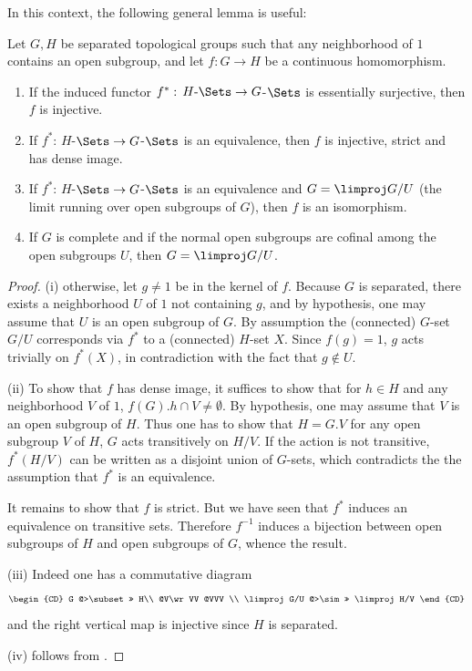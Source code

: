 \medskip In this context, the following general lemma is useful:

\begin{lem}\label{lem::1.4.9} Let $G, H$ be separated topological groups
 such that any neighborhood of $1$ contains an open 
 subgroup, and let $f: G\to H$ be a continuous homomorphism.
 \begin{enumerate}
  \item If the induced functor 
	$f^\ast:\,\text{$H$-$\Sets$}\to G$-$\Sets$ is essentially
	surjective, then $f$ is injective.
  \item If $f^\ast:\,H$-$\Sets \to G$-$\Sets$ is an equivalence, then $f$ is
	injective, strict and has dense image.
  \item If $f^\ast:\,H$-$\Sets\to G$-$\Sets$ is an equivalence and $G=
	\limproj G/U$ (the limit running over open subgroups of $G$),
	then $f$ is an isomorphism.
  \item If $G$ is complete and if the normal open subgroups are cofinal
	among the open subgroups $U$, then $G=\limproj G/U$.
 \end{enumerate}
\end{lem}
  
\begin{proof}
 (i) otherwise, let $g\neq 1$ be in the kernel of $f$. Because $G$ is
 separated, there exists a neighborhood $U$ of $1$ not containing $g$,
 and by hypothesis, one may assume that $U$ is an open subgroup of
 $G$. By assumption the (connected) $G$-set $G/U$ corresponds via
 $f^\ast$ to a (connected) $H$-set $X$. Since $f(g)=1$, $g$ acts 
 trivially on $f^\ast(X)$, in contradiction with the fact that $g\notin U$.

 (ii) To show that $f$ has dense image, it suffices to show that for $h\in
 H$ and any neighborhood $V$ of $1$, $f(G).h \cap V\neq \emptyset$. By
 hypothesis, one may assume that $V$ is an open 
 subgroup of $H$. Thus one has to show that $H=G.V$ for 
 any open subgroup $V$ of $H$, \ie $G$ acts transitively on $H/V$. If the
 action is not transitive, $f^{\ast}(H/V)$ can be 
 written as a disjoint union of $G$-sets, which contradicts the
 the assumption that $f^{\ast}$ is an equivalence. 

 \noindent It remains to show that $f$ is strict. But we have seen that
 $f^\ast$ induces an equivalence on transitive sets. 
 Therefore $f^{-1}$ induces a bijection between open subgroups of $H$
 and open subgroups of $G$, whence the result.

 (iii) Indeed one has a commutative diagram
 \begin{equation*}
 \begin{CD}
  G @>\subset>> H\\
  @V\wr VV @VVV \\
 \limproj G/U @>\sim>> \limproj H/V
 \end{CD}
 \end{equation*}
 and the right vertical map is injective since $H$ is separated.

 (iv) follows from \cite[III.7.2, prop. 2]{bourbaki74:_topol}.
\end{proof}

